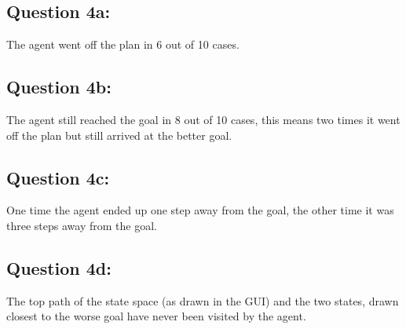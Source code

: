 \subsection*{Question 4a:}\label{sec:4a}

The agent went off the plan in 6 out of 10 cases.

\subsection*{Question 4b:}\label{sec:4b}

The agent still reached the goal in 8 out of 10 cases, this means two times it went off the plan but still arrived at the better goal.

\subsection*{Question 4c:}\label{sec:4c}

One time the agent ended up one step away from the goal, the other time it was three steps away from the goal.

\subsection*{Question 4d:}\label{sec:4d}

The top path of the state space (as drawn in the GUI) and the two states, drawn closest to the worse goal have never been visited by the agent.
